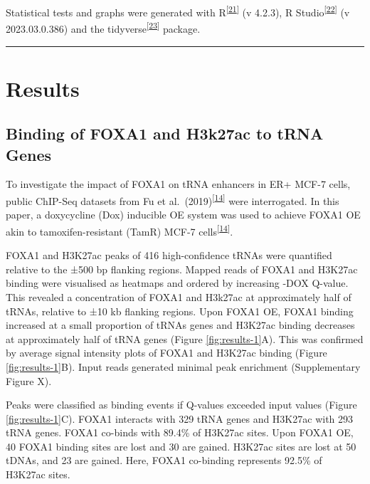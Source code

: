 \documentclass[
  12pt,
]{article}
\begin{document}
Statistical tests and graphs were generated with R\textsuperscript{{[}\protect\hyperlink{ref-r}{21}{]}} (v 4.2.3), R Studio\textsuperscript{{[}\protect\hyperlink{ref-rstudio}{22}{]}} (v 2023.03.0.386) and the tidyverse\textsuperscript{{[}\protect\hyperlink{ref-wickham2019}{23}{]}} package.

\begin{center}\rule{0.5\linewidth}{0.5pt}\end{center}

\hypertarget{results}{%
\section{Results}\label{results}}

\hypertarget{binding-of-foxa1-and-h3k27ac-to-trna-genes}{%
\subsection{Binding of FOXA1 and H3k27ac to tRNA Genes}\label{binding-of-foxa1-and-h3k27ac-to-trna-genes}}

To investigate the impact of FOXA1 on tRNA enhancers in ER+ MCF-7 cells, public ChIP-Seq datasets from Fu et al.~(2019)\textsuperscript{{[}\protect\hyperlink{ref-fu2019}{14}{]}} were interrogated.
In this paper, a doxycycline (Dox) inducible OE system was used to achieve FOXA1 OE akin to tamoxifen-resistant (TamR) MCF-7 cells\textsuperscript{{[}\protect\hyperlink{ref-fu2019}{14}{]}}.

FOXA1 and H3K27ac peaks of 416 high-confidence tRNAs were quantified relative to the ±500 bp flanking regions.
Mapped reads of FOXA1 and H3K27ac binding were visualised as heatmaps and ordered by increasing -DOX Q-value.
This revealed a concentration of FOXA1 and H3k27ac at approximately half of tRNAs, relative to ±10 kb flanking regions.
Upon FOXA1 OE, FOXA1 binding increased at a small proportion of tRNAs genes and H3K27ac binding decreases at approximately half of tRNA genes (Figure \ref{fig:results-1}A).
This was confirmed by average signal intensity plots of FOXA1 and H3K27ac binding (Figure \ref{fig:results-1}B).
Input reads generated minimal peak enrichment (Supplementary Figure X).

Peaks were classified as binding events if Q-values exceeded input values (Figure \ref{fig:results-1}C).
FOXA1 interacts with 329 tRNA genes and H3K27ac with 293 tRNA genes.
FOXA1 co-binds with 89.4\% of H3K27ac sites.
Upon FOXA1 OE, 40 FOXA1 binding sites are lost and 30 are gained.
H3K27ac sites are lost at 50 tDNAs, and 23 are gained.
Here, FOXA1 co-binding represents 92.5\% of H3K27ac sites.
\end{document}
